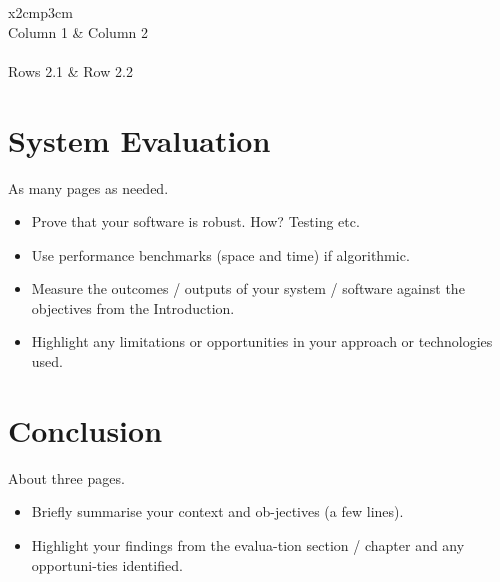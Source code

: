 \begin{table}[h]
  \centering
  \begin{tabular}{x{2cm}p{3cm}}
    \toprule \\
    Column 1 & Column 2 \\
    \midrule \\
    Rows 2.1 & Row 2.2 \\
    \bottomrule
  \end{tabular}
  \caption{A table.}
  \label{table:mytable}
\end{table}

\chapter{System Evaluation}
As many pages as needed.
\begin{itemize}
\item Prove that your software is robust. How? Testing etc. 
\item Use performance benchmarks (space and time) if algorithmic.
\item Measure the outcomes / outputs of your system / software against the objectives from the Introduction.
\item Highlight any limitations or opportunities in your approach or technologies used.
\end{itemize}

\chapter{Conclusion}
About three pages.

\begin{itemize}
\item Briefly summarise your context and ob-jectives (a few lines).
\item Highlight your findings from the evalua-tion section / chapter and any opportuni-ties identified.
\end{itemize}


